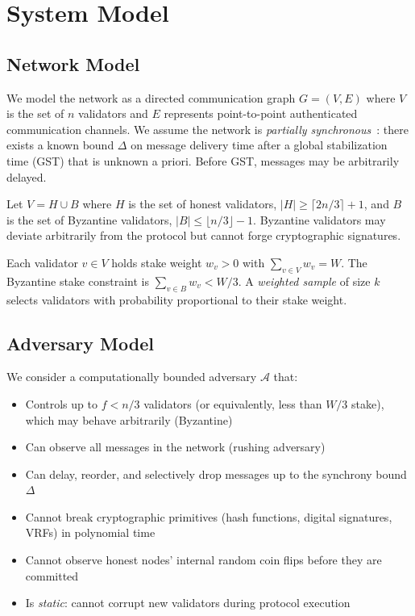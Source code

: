 \section{System Model}

\label{sec:model}

\subsection{Network Model}

We model the network as a directed communication graph $G = (V, E)$ where $V$ is the set
of $n$ validators and $E$ represents point-to-point authenticated communication channels.
We assume the network is \emph{partially synchronous}~\cite{dwork1988consensus}: there
exists a known bound $\Delta$ on message delivery time after a global stabilization time
(GST) that is unknown a priori. Before GST, messages may be arbitrarily delayed.

\begin{definition}
Let $V = H \cup B$ where $H$ is the set of honest validators, $|H| \geq \lceil 2n/3 \rceil + 1$,
and $B$ is the set of Byzantine validators, $|B| \leq \lfloor n/3 \rfloor - 1$. Byzantine
validators may deviate arbitrarily from the protocol but cannot forge cryptographic signatures.
\end{definition}

\begin{definition}
Each validator $v \in V$ holds stake weight $w_v > 0$ with $\sum_{v \in V} w_v = W$.
The Byzantine stake constraint is $\sum_{v \in B} w_v < W/3$.
A \emph{weighted sample} of size $k$ selects validators with probability proportional
to their stake weight.
\end{definition}

\subsection{Adversary Model}

We consider a computationally bounded adversary $\mathcal{A}$ that:
\begin{itemize}
\item Controls up to $f < n/3$ validators (or equivalently, less than $W/3$ stake),
which may behave arbitrarily (Byzantine)
\item Can observe all messages in the network (rushing adversary)
\item Can delay, reorder, and selectively drop messages up to the synchrony bound $\Delta$
\item Cannot break cryptographic primitives (hash functions, digital signatures, VRFs) in
polynomial time
\item Cannot observe honest nodes' internal random coin flips before they are committed
\item Is \emph{static}: cannot corrupt new validators during protocol execution
\end{itemize}


